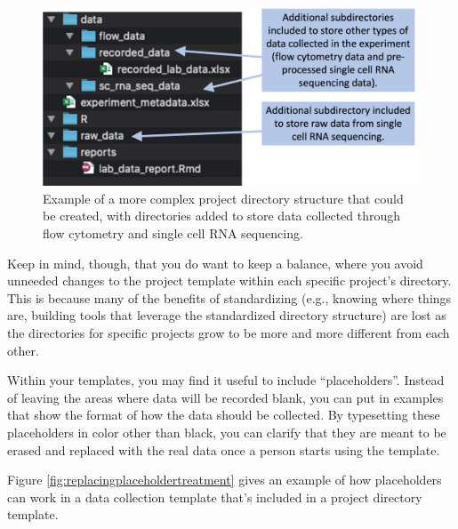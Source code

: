 \documentclass[]{tufte-book}
\begin{document}
\begin{figure}
\includegraphics[width=\textwidth]{figures/project_template_morecomplex} \caption[Example of a more complex project directory structure that could be created, with directories added to store data collected through flow cytometry and single cell RNA sequencing]{Example of a more complex project directory structure that could be created, with directories added to store data collected through flow cytometry and single cell RNA sequencing.}\label{fig:projecttemplatecomplex}
\end{figure}

Keep in mind, though, that you do want to keep a balance, where you avoid
unneeded changes to the project template within each specific project's
directory. This is because many of the benefits of standardizing (e.g.,
knowing where things are, building tools that leverage the standardized
directory structure) are lost as the directories for specific projects grow
to be more and more different from each other.

Within your templates, you may find it useful to include ``placeholders''. Instead
of leaving the areas where data will be recorded blank, you can put in examples
that show the format of how the data should be collected. By typesetting these
placeholders in color other than black, you can clarify that they are meant to
be erased and replaced with the real data once a person starts using the
template.

Figure \ref{fig:replacingplaceholdertreatment} gives an example of how
placeholders can work in a data collection template that's included in a
project directory template.
\end{document}
